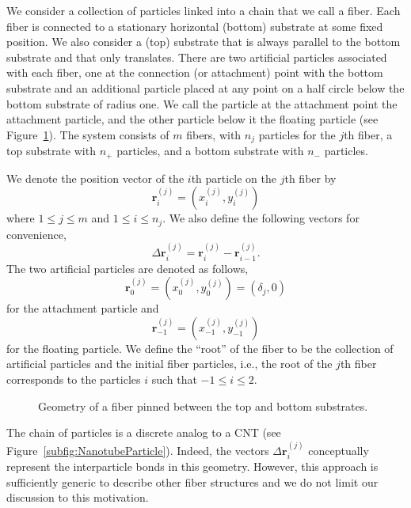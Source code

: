 We consider a collection of particles linked into a chain that we call a fiber. Each fiber is connected to a stationary horizontal (bottom) substrate at some fixed position. We also consider a (top) substrate that is always parallel to the bottom substrate and that only translates. There are two artificial particles associated with each fiber, one at the connection (or attachment) point with the bottom substrate and an additional particle placed at any point on a half circle below the bottom substrate of radius one. We call the particle at the attachment point the attachment particle, and the other particle below it the floating particle (see Figure~\ref{fig:Geometry}). The system consists of $m$ fibers, with $n_j$ particles for the $j$th fiber, a top substrate with $n_+$ particles, and a bottom substrate with $n_-$ particles.

We denote the position vector of the $i$th particle on the $j$th fiber by
\begin{equation}
	\textbf{r}_i^{(j)} = (x_i^{(j)},y_i^{(j)})
\end{equation}
where $1 \leq j \leq m$ and $1 \leq i \leq n_j$. We also define the following vectors for convenience,
\begin{equation}
	\Delta \textbf{r}_i^{(j)} = \textbf{r}_i^{(j)} - \textbf{r}_{i-1}^{(j)}.
\end{equation}
The two artificial particles are denoted as follows,
\begin{equation}
	\textbf{r}_0^{(j)} = (x_0^{(j)},y_0^{(j)}) = (\delta_j,0)
\end{equation}
for the attachment particle and
\begin{equation}
	\textbf{r}_{-1}^{(j)} = (x_{-1}^{(j)},y_{-1}^{(j)})
\end{equation}
for the floating particle. We define the ``root'' of the fiber to be the collection of artificial particles and the initial fiber particles, i.e., the root of the $j$th fiber corresponds to the particles $i$ such that $-1 \leq i \leq 2$.

	\begin{figure}[t]
		\begin{center}
			
		\end{center}		
		\caption{Geometry of a fiber pinned between the top and bottom substrates.
		\label{fig:Geometry}}
	\end{figure}


The chain of particles is a discrete analog to a CNT (see Figure~\ref{subfig:NanotubeParticle}). Indeed, the vectors $\Delta \textbf{r}_i^{(j)}$ conceptually represent the interparticle bonds in this geometry. However, this approach is sufficiently generic to describe other fiber structures and we do not limit our discussion to this motivation.

